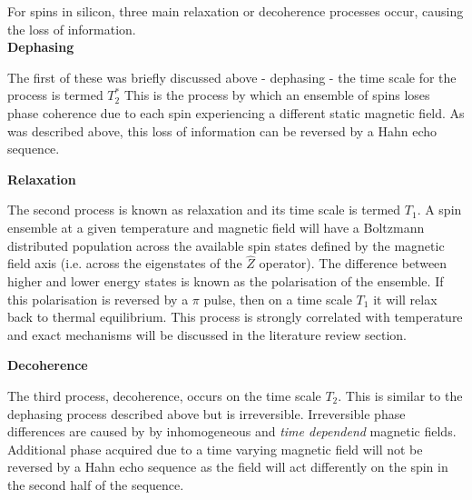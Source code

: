 For spins in silicon, three main relaxation or decoherence processes occur, causing the loss of information.
\\
\textbf{Dephasing}
\begin{adjustwidth}{1.5cm}{}
The first of these was briefly discussed above - dephasing - the time scale for the process is termed \textbf{$T_2^*$}
This is the process by which an ensemble of spins loses phase coherence due to each spin experiencing a different static magnetic field.
As was described above, this loss of information can be reversed by a Hahn echo sequence.
\end{adjustwidth}
\textbf{Relaxation}
\begin{adjustwidth}{1.5cm}{}
The second process is known as relaxation and its time scale is termed $T_1$. A spin ensemble at a given temperature and magnetic field will have a Boltzmann distributed population across the available spin states defined by the magnetic field axis (i.e. across the eigenstates of the $\hat{Z}$ operator).
The difference between higher and lower energy states is known as the polarisation of the ensemble.
If this polarisation is reversed by a $\pi$ pulse, then on a time scale $T_1$ it will relax back to thermal equilibrium.
This process is strongly correlated with temperature and exact mechanisms will be discussed in the literature review section.
\end{adjustwidth}
\textbf{Decoherence}
\begin{adjustwidth}{1.5cm}{}
The third process, decoherence, occurs on the time scale $T_2$. 
This is similar to the dephasing process described above but is irreversible. 
Irreversible phase differences are caused by by inhomogeneous and \textit{time dependend} magnetic fields. 
Additional phase acquired due to a time varying magnetic field will not be reversed by a Hahn echo sequence as the field will act differently on the spin in the second half of the sequence.
\end{adjustwidth}